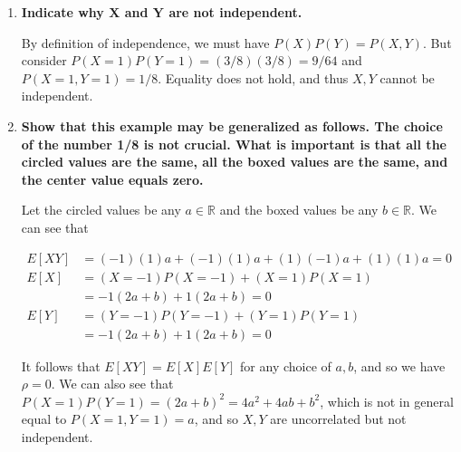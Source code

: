 \documentclass[10pt, oneside]{article}
\begin{document}
\begin{enumerate}[label=7.\arabic*]
\begin{enumerate}
	  \begin{align*}
	  E[XY] &= (X = -1)(Y = -1) P(X = -1, Y = -1) + (X = -1)(Y = 1) P(X = -1, Y = 1) \\
	  &\quad + (X = 1)(Y = -1) P(X = 1, Y = -1) + (X = 1)(Y = 1) P(X = 1, Y = 1) = 0  \\
	  E[X] &= (X = -1) P(X = -1) + (X = 1) P(X = 1) = 0 \\
	  E[Y] &= (Y = -1) P(Y = -1) + (Y = 1) P(Y = 1) = 0
	  \end{align*}
	  
	  Therefore, $\boxed{E[XY] = E[X] E[Y] = 0 \implies \rho = 0}$.
	  
	\item  \begin{tcolorbox}[
	  colback=Cerulean!5!white,
	  colframe=Cerulean!75!black]
	  \textbf{Indicate why $\bm{X}$ and $\bm{Y}$ are not independent.}
	  \end{tcolorbox}
	  
	  By definition of independence, we must have $P(X) P(Y) = P(X,Y)$. But consider $P(X = 1) P(Y = 1) = (3/8) (3/8) = 9/64$ and $P(X = 1, Y = 1) = 1/8$. Equality does not hold, and thus $X,Y$ cannot be independent.
	  
	\item  \begin{tcolorbox}[
	  colback=Cerulean!5!white,
	  colframe=Cerulean!75!black]
	  \textbf{Show that this example may be generalized as follows. The choice of the number 1/8 is not crucial. What is important is that all the circled values are the same, all the boxed values are the same, and the center value equals zero.}
	  \end{tcolorbox}
	  
	  Let the circled values be any $a \in \mathbb{R}$ and the boxed values be any $b \in \mathbb{R}$. We can see that
	  
	  \begin{align*}
	  E[XY] &= (-1)(1) a + (-1)(1) a + (1)(-1) a + (1)(1) a = 0 \\
	  E[X] &= (X = -1) P(X = -1) + (X = 1) P(X = 1) \\
	  &= -1 (2a + b) + 1 (2a + b) = 0 \\
	  E[Y] &= (Y = -1) P(Y = -1) + (Y = 1) P(Y = 1) \\
	  &= -1 (2a + b) + 1 (2a + b) = 0
	  \end{align*}
	  
	  It follows that $E[XY] = E[X]E[Y]$ for any choice of $a, b$, and so we have $\rho = 0$. We can also see that $P(X = 1) P(Y = 1) = (2a + b)^2 = 4a^2 + 4ab + b^2$, which is not in general equal to $P(X = 1, Y = 1) = a$, and so $X,Y$ are uncorrelated but not independent.
	\end{enumerate}


\end{enumerate}
\end{document}

